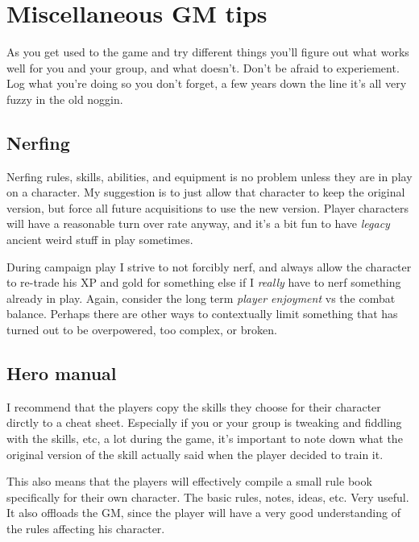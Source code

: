 
\section*{Miscellaneous GM tips}

As you get used to the game and try different things you'll figure out what works well for you and your group, and what doesn't. Don't be afraid to experiement. Log what you're doing so you don't forget, a few years down the line it's all very fuzzy in the old noggin.


\subsection*{Nerfing}
Nerfing rules, skills, abilities, and equipment is no problem unless they are in play on a character. My suggestion is to just allow that character to keep the original version, but force all future acquisitions to use the new version. Player characters will have a reasonable turn over rate anyway, and it's a bit fun to have \emph{legacy} ancient weird stuff in play sometimes.

During campaign play I strive to not forcibly nerf, and always allow the character to re-trade his XP and gold for something else if I \emph{really} have to nerf something already in play. Again, consider the long term \emph{player enjoyment} vs the combat balance. Perhaps there are other ways to contextually limit something that has turned out to be overpowered, too complex, or broken.


\subsection*{Hero manual}
I recommend that the players copy the skills they choose for their character dirctly to a cheat sheet. Especially if you or your group is tweaking and fiddling with the skills, etc, a lot during the game, it's important to note down what the original version of the skill actually said when the player decided to train it.

This also means that the players will effectively compile a small rule book specifically for their own character. The basic rules, notes, ideas, etc. Very useful. It also offloads the GM, since the player will have a very good understanding of the rules affecting his character.

